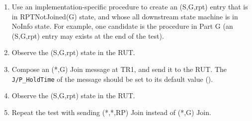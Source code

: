 \documentclass[11pt]{report}
\begin{document}
\begin{enumerate}

  \item Use an implementation-specific procedure to create an (S,G,rpt) entry
  that is in RPTNotJoined(G) state, and whose all downstream state machine is
  in NoInfo state. For example, one candidate is the procedure in Part G
  (an (S,G,rpt) entry may exists at the end of the test).

  \item Observe the (S,G,rpt) state in the RUT.

  \item Compose an (*,G) Join message at TR1, and send it to the RUT.
  The \verb=J/P_HoldTime= of the message should be set to its default
  value ({\PimsmJPHoldTime}).

  \item Observe the (S,G,rpt) state in the RUT.

  \item Repeat the test with sending (*,*,RP) Join instead of (*,G)
  Join.

\end{enumerate}

\end{document}
